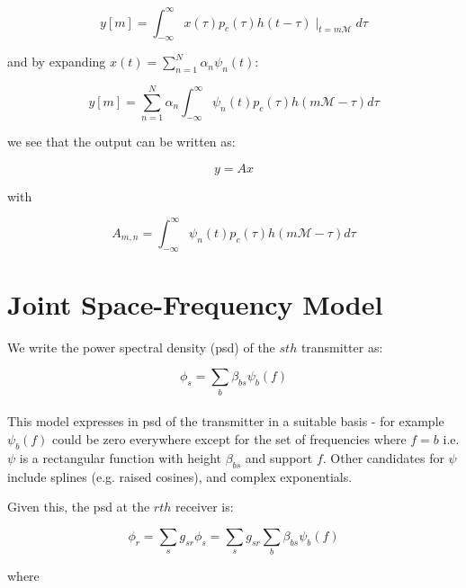 \documentclass{article}
\begin{document}
\begin{equation}
y\left[m\right] = \int_{-\infty}^{\infty} x\left(\tau\right)p_c\left(\tau\right)h\left(t - \tau\right)\mid_{t = m\mathcal{M}}d\tau
\end{equation}

and by expanding \(x\left(t\right) = \sum_{n=1}^N \alpha_n \psi_n\left(t\right)\):

\begin{equation}
y\left[m\right] =  \sum_{n=1}^N \alpha_n \int_{-\infty}^{\infty} \psi_n\left(t\right)p_c\left(\tau\right)h\left(m\mathcal{M} - \tau\right)d\tau
\end{equation}

we see that the output can be written as:

\begin{equation}
y = Ax
\end{equation}

with

\begin{equation}
A_{m,n} = \int_{-\infty}^{\infty} \psi_n\left(t\right)p_c\left(\tau\right)h\left(m\mathcal{M} - \tau\right)d\tau
\end{equation}

\section{Joint Space-Frequency Model}
We write the power spectral density (psd) of the \(sth\) transmitter as:

\begin{equation}
\phi_s = \sum_b \beta_{bs} \psi_b\left(f\right)
\label{basis_expansion}
\end{equation}
\\ 

This model expresses in psd of the transmitter in a suitable basis - for example \(\psi_b\left(f\right)\) could be zero everywhere except for the set of frequencies where \(f=b\) i.e. \(\psi\) is a rectangular function with height \(\beta_{bs}\) and support \(f\). Other candidates for \(\psi\) include splines (e.g. raised cosines), and complex exponentials. 

Given this, the psd at the \(rth\) receiver is:

\begin{equation}
\phi_r = \sum_s g_{sr}\phi_s = \sum_s g_{sr} \sum _b \beta_{bs}\psi_b\left(f\right)
\end{equation}

where
\end{document}
